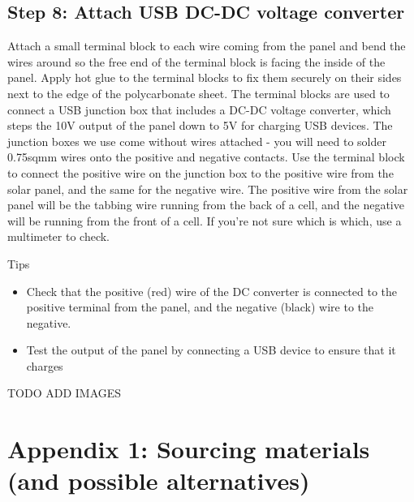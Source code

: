 \documentclass{article}
\theoremstyle{definition}
\theoremstyle{definition}
\theoremstyle{remark}
\begin{document}

  \subsection{Step 8: Attach USB DC-DC voltage converter} %
  \label{sub:step_8_attach_usb_dc_dc_voltage_converter}

    Attach a small terminal block to each wire coming from the panel and bend the wires around so the free end of the terminal block is facing the inside of the panel. Apply hot glue to the terminal blocks to fix them securely on their sides next to the edge of the polycarbonate sheet. The terminal blocks are used to connect a USB junction box that includes a DC-DC voltage converter, which steps the 10V output of the panel down to 5V for charging USB devices. The junction boxes we use come without wires attached - you will need to solder 0.75sqmm wires onto the positive and negative contacts. Use the terminal block to connect the positive wire on the junction box to the positive wire from the solar panel, and the same for the negative wire. The positive wire from the solar panel will be the tabbing wire running from the back of a cell, and the negative will be running from the front of a cell. If you’re not sure which is which, use a multimeter to check.

    Tips

    \begin{itemize}
      \item Check that the positive (red) wire of the DC converter is connected to the positive terminal from the panel, and the negative (black) wire to the negative.
      \item Test the output of the panel by connecting a USB device to ensure that it charges
    \end{itemize}

    TODO ADD IMAGES
  


\newpage

\section{Appendix 1: Sourcing materials (and possible alternatives)} %
\label{sec:appendix_1_sourcing_materials_and_possible_alternatives_}
\end{document}
